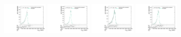 \begin{figure}[htpb]
  \centering
  \includegraphics[width=0.2\textwidth]{fig/2Dfit/templateVsReco_WprToWH2000_r0_MVV_mu_HP_nobb_LDy_linear.pdf}
  \includegraphics[width=0.2\textwidth]{fig/2Dfit/templateVsReco_WprToWH2000_r0_MVV_mu_LP_nobb_LDy_linear.pdf}
  \includegraphics[width=0.2\textwidth]{fig/2Dfit/templateVsReco_WprToWH2000_r0_MVV_mu_HP_nobb_HDy_linear.pdf}
  \includegraphics[width=0.2\textwidth]{fig/2Dfit/templateVsReco_WprToWH2000_r0_MVV_mu_LP_nobb_HDy_linear.pdf}\\

\end{figure}
